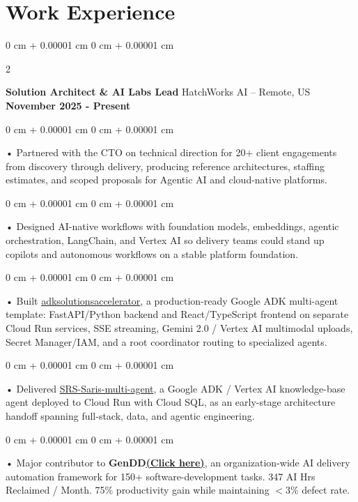 \documentclass[10pt, letterpaper]{article}
\newenvironment{onecolentry}{
    \begin{adjustwidth}{
        0 cm + 0.00001 cm
    }{
        0 cm + 0.00001 cm
    }
}{
    \end{adjustwidth}
} %
\newenvironment{twocolentry}[2][]{
    \onecolentry
    \def\secondColumn{#2}
    \setcolumnwidth{\fill, 4.5 cm}
    \begin{paracol}{2}
}{
    \switchcolumn \raggedleft \secondColumn
    \end{paracol}
    \endonecolentry
} %
\begin{document}
    \vspace{0.5cm}
    \section{Work Experience}
        \vspace{0.1cm}

        \begin{twocolentry}{
            \textbf{November 2025 - Present}
        }
            \textbf{Solution Architect \& AI Labs Lead} HatchWorks AI -- Remote, US\end{twocolentry}

        \begin{onecolentry}
             • Partnered with the CTO on technical direction for 20+ client engagements from discovery through delivery, producing reference architectures, staffing estimates, and scoped proposals for Agentic AI and cloud-native platforms.
        \end{onecolentry}
        \begin{onecolentry}
             • Designed AI-native workflows with foundation models, embeddings, agentic orchestration, LangChain, and Vertex AI so delivery teams could stand up copilots and autonomous workflows on a stable platform foundation.
        \end{onecolentry}
        \begin{onecolentry}
             • Built \href{https://github.com/sreenikethaathreya-hw/adksolutionsaccelerator}{adksolutionsaccelerator}, a production-ready Google ADK multi-agent template: FastAPI/Python backend and React/TypeScript frontend on separate Cloud Run services, SSE streaming, Gemini 2.0 / Vertex AI multimodal uploads, Secret Manager/IAM, and a root coordinator routing to specialized agents.
        \end{onecolentry}
        \begin{onecolentry}
             • Delivered \href{https://github.com/sreenikethaathreya-hw/SRS-Saris-multi-agent}{SRS-Saris-multi-agent}, a Google ADK / Vertex AI knowledge-base agent deployed to Cloud Run with Cloud SQL, as an early-stage architecture handoff spanning full-stack, data, and agentic engineering.
        \end{onecolentry}
        \begin{onecolentry}
             • Major contributor to \textbf{GenDD}\href{https://hatchworks.com/generative-driven-development/}{\textbf{(Click here)}}, an organization-wide AI delivery automation framework for 150+ software-development tasks. 347 AI Hrs Reclaimed / Month. 75\% productivity gain while maintaining $<$3\% defect rate.
        \end{onecolentry}
\end{document}
